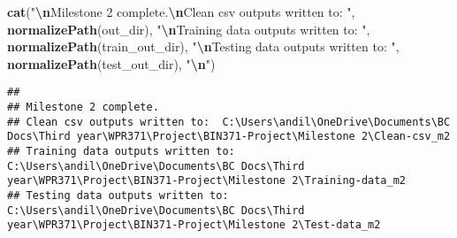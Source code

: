 \documentclass[
]{article}
\newenvironment{Shaded}{\begin{snugshade}}{\end{snugshade}}
\newcommand{\FunctionTok}[1]{\textcolor[rgb]{0.13,0.29,0.53}{\textbf{#1}}}
\newcommand{\NormalTok}[1]{#1}
\newcommand{\SpecialCharTok}[1]{\textcolor[rgb]{0.81,0.36,0.00}{\textbf{#1}}}
\newcommand{\StringTok}[1]{\textcolor[rgb]{0.31,0.60,0.02}{#1}}
\begin{document}
\begin{Shaded}
\begin{Highlighting}[]
\FunctionTok{cat}\NormalTok{(}\StringTok{"}\SpecialCharTok{\textbackslash{}n}\StringTok{Milestone 2 complete.}\SpecialCharTok{\textbackslash{}n}\StringTok{Clean csv outputs written to: "}\NormalTok{, }\FunctionTok{normalizePath}\NormalTok{(out\_dir), }\StringTok{"}\SpecialCharTok{\textbackslash{}n}\StringTok{Training data outputs written to: "}\NormalTok{, }\FunctionTok{normalizePath}\NormalTok{(train\_out\_dir), }\StringTok{"}\SpecialCharTok{\textbackslash{}n}\StringTok{Testing data outputs written to: "}\NormalTok{, }\FunctionTok{normalizePath}\NormalTok{(test\_out\_dir), }\StringTok{"}\SpecialCharTok{\textbackslash{}n}\StringTok{"}\NormalTok{)}
\end{Highlighting}
\end{Shaded}

\begin{verbatim}
## 
## Milestone 2 complete.
## Clean csv outputs written to:  C:\Users\andil\OneDrive\Documents\BC Docs\Third year\WPR371\Project\BIN371-Project\Milestone 2\Clean-csv_m2 
## Training data outputs written to:  C:\Users\andil\OneDrive\Documents\BC Docs\Third year\WPR371\Project\BIN371-Project\Milestone 2\Training-data_m2 
## Testing data outputs written to:  C:\Users\andil\OneDrive\Documents\BC Docs\Third year\WPR371\Project\BIN371-Project\Milestone 2\Test-data_m2
\end{verbatim}
\end{document}
